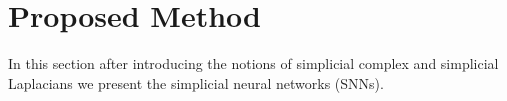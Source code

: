 \section{Proposed Method}
In this section after introducing the notions of simplicial complex and simplicial Laplacians we present the simplicial neural networks (SNNs). 




